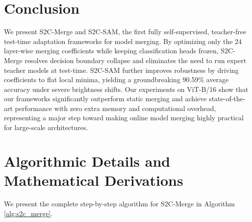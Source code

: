 \documentclass{article}
\theoremstyle{plain}
\theoremstyle{definition}
\theoremstyle{remark}
\begin{document}
\vspace{-4pt}
\section{Conclusion}
\label{sec:conclusion}
We present S2C-Merge and S2C-SAM, the first fully self-supervised, teacher-free test-time adaptation frameworks for model merging. By optimizing only the 24 layer-wise merging coefficients while keeping classification heads frozen, S2C-Merge resolves decision boundary collapse and eliminates the need to run expert teacher models at test-time. S2C-SAM further improves robustness by driving coefficients to flat local minima, yielding a groundbreaking 90.59\% average accuracy under severe brightness shifts. Our experiments on ViT-B/16 show that our frameworks significantly outperform static merging and achieve state-of-the-art performance with zero extra memory and computational overhead, representing a major step toward making online model merging highly practical for large-scale architectures.

\nocite{*}



\newpage
\appendix
\onecolumn
\section{Algorithmic Details and Mathematical Derivations}

We present the complete step-by-step algorithm for S2C-Merge in Algorithm \ref{alg:s2c_merge}.
\end{document}
